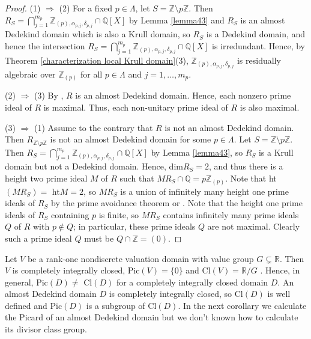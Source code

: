 \documentclass[10pt]{article}
\numberwithin{equation}{section}
\theoremstyle{definition}
\theoremstyle{definition}
\newcommand{\Q}{\mathbb{Q}}
\newcommand{\Z}{\mathbb{Z}}
\begin{document}
\begin{proof}
(1) $\Rightarrow$ (2) For a fixed $p \in \Lambda$, let $S = \Z \setminus p\Z$.
Then $R_S = \bigcap\limits_{j=1}^{m_p}\Z_{(p),\alpha_{p,j},\delta_{p,j}} \cap\Q[X]$ by Lemma \ref{lemma43}
and $R_S$ is an almost Dedekind domain which is also a Krull domain, so $R_S$ is a Dedekind domain, and hence the intersection
$R_S = \bigcap\limits_{j=1}^{m_p}\Z_{(p),\alpha_{p,j},\delta_{p,j}} \cap\Q[X]$ is irredundant.
Hence, by Theorem \ref{characterization local Krull domain}(3),  $\Z_{(p),\alpha_{p,j},\delta_{p,j}}$
is residually algebraic over $\Z_{(p)}$ for all $p \in \Lambda$ and $j =1, \dots, m_p$.

(2) $\Rightarrow$ (3) By \cite[Corollary 2.6(1)]{Chang},
$R$ is an almost Dedekind domain. Hence, each nonzero prime ideal of $R$ is maximal. Thus, each non-unitary prime ideal of $R$ is also maximal.

(3) $\Rightarrow$ (1) Assume to the contrary that $R$ is not an almost Dedekind domain. Then $R_{\mathbb{Z} \setminus p\mathbb{Z}}$ is not an almost Dedekind domain for some $p \in \Lambda$. Let $S = \Z \setminus p\Z$. Then $R_{S} = \bigcap\limits_{j=1}^{m_p}\Z_{(p),\alpha_{p,j},\delta_{p,j}} \cap\Q[X]$ by Lemma \ref{lemma43}, so $R_{S}$ is a Krull domain but not a Dedekind domain. Hence, dim$R_S =2$,
and thus there is a height two prime ideal $M$ of $R$ such that $MR_S \cap \Q = p\Z_{(p)}$. Note that ht$(MR_S) =$ ht$M =2$, so $MR_S$ is a union of
infinitely many height one prime ideals of $R_S$ by the prime avoidance theorem \cite[Proposition 4.9]{Gilm} or \cite[Proposition 2.1]{Heitmann}.
Note that the height one prime ideals of $R_S$ containing $p$ is finite, so $MR_S$ contains infinitely
many prime ideals $Q$ of $R$ with $p \not\in Q$; in particular, these prime ideals $Q$ are not maximal. 
Clearly such a prime ideal $Q$ must be $Q \cap \Z = (0)$. 
\end{proof}

Let $V$ be a rank-one nondiscrete valuation domain with value group $G \subsetneq \mathbb{R}$. Then $V$ is completely integrally closed,
Pic$(V) = \{0\}$ and Cl$(V) = \mathbb{R}/G$ \cite[Theorem 2.7]{afz08}.
Hence, in general, Pic$(D) \neq$ Cl$(D)$ for a completely integrally closed domain $D$. An almost Dedekind domain $D$ is completely integrally closed, so Cl$(D)$ is well defined and Pic$(D)$ is a subgroup of Cl$(D)$. In the next corollary we calculate the Picard of an almost Dedekind domain but we don't known how to calculate its divisor class group.   
\end{document}

